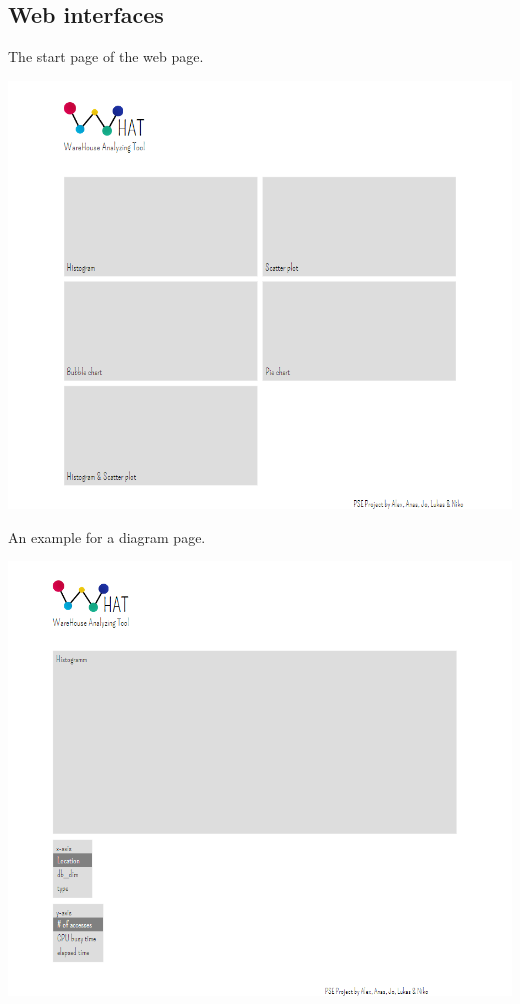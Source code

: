 \subsection{Web interfaces}
The start page of the web page.
\begin{center}
\includegraphics[width=1\linewidth]{Pictures/WHAT-Start.png}
\end{center} 
\newpage
An example for a \gls{diagram} page.
\begin{center}
\includegraphics[width=1\linewidth]{Pictures/WHAT-Histogram.png}
\end{center} 










